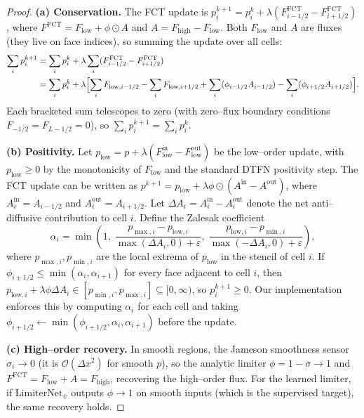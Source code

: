 \documentclass[10pt]{article}
\theoremstyle{definition}
\theoremstyle{remark}
\begin{document}
\begin{proof}
\textbf{(a) Conservation.}
The FCT update is $p^{k+1}_i = p^k_i + \lambda (F^{\mathrm{FCT}}_{i-1/2} -
F^{\mathrm{FCT}}_{i+1/2})$, where $F^{\mathrm{FCT}} = F_{\mathrm{low}} +
\phi \odot A$ and $A = F_{\mathrm{high}} - F_{\mathrm{low}}$.
Both $F_{\mathrm{low}}$ and $A$ are fluxes (they live on face
indices), so summing the update over all cells:
\begin{align*}
  \sum_i p^{k+1}_i
  &= \sum_i p^k_i + \lambda \sum_i (F^{\mathrm{FCT}}_{i-1/2} - F^{\mathrm{FCT}}_{i+1/2}) \\
  &= \sum_i p^k_i + \lambda \Bigl[
       \sum_i F_{\mathrm{low},i-1/2} - \sum_i F_{\mathrm{low},i+1/2}
       + \sum_i (\phi_{i-1/2} A_{i-1/2}) - \sum_i (\phi_{i+1/2} A_{i+1/2})
     \Bigr].
\end{align*}
Each bracketed sum telescopes to zero (with zero--flux boundary
conditions $F_{-1/2} = F_{L-1/2} = 0$), so $\sum_i p^{k+1}_i = \sum_i
p^k_i$.

\textbf{(b) Positivity.}
Let $p_{\mathrm{low}} = p + \lambda (F_{\mathrm{low}}^{\mathrm{in}} -
F_{\mathrm{low}}^{\mathrm{out}})$ be the low--order update, with
$p_{\mathrm{low}} \ge 0$ by the monotonicity of $F_{\mathrm{low}}$ and
the standard DTFN positivity step.  The FCT update can be written as
$p^{k+1} = p_{\mathrm{low}} + \lambda \phi \odot (A^{\mathrm{in}} -
A^{\mathrm{out}})$, where $A^{\mathrm{in}}_i = A_{i-1/2}$ and
$A^{\mathrm{out}}_i = A_{i+1/2}$.  Let $\Delta A_i = A^{\mathrm{in}}_i
- A^{\mathrm{out}}_i$ denote the net anti--diffusive contribution to
cell $i$.  Define the Zalesak coefficient
\[
  \alpha_i = \min\!\left(1,\;
    \frac{p_{\max,i} - p_{\mathrm{low},i}}{\max(\Delta A_i, 0) + \varepsilon},\;
    \frac{p_{\mathrm{low},i} - p_{\min,i}}{\max(-\Delta A_i, 0) + \varepsilon}
  \right),
\]
where $p_{\max,i}, p_{\min,i}$ are the local extrema of $p_{\mathrm{low}}$
in the stencil of cell $i$.  If $\phi_{i\pm 1/2} \le \min(\alpha_i,
\alpha_{i+1})$ for every face adjacent to cell $i$, then
$p_{\mathrm{low},i} + \lambda \phi \Delta A_i \in [p_{\min,i},
p_{\max,i}] \subseteq [0, \infty)$, so $p^{k+1}_i \ge 0$.  Our
implementation enforces this by computing $\alpha_i$ for each cell
and taking $\phi_{i+1/2} \leftarrow \min(\phi_{i+1/2}, \alpha_i,
\alpha_{i+1})$ before the update.

\textbf{(c) High--order recovery.}
In smooth regions, the Jameson smoothness sensor $\sigma_i \to 0$ (it
is $\mathcal{O}(\Delta x^2)$ for smooth $p$), so the analytic limiter
$\phi = 1 - \sigma \to 1$ and $F^{\mathrm{FCT}} = F_{\mathrm{low}} + A
= F_{\mathrm{high}}$, recovering the high--order flux.  For the
learned limiter, if $\mathrm{LimiterNet}_\psi$ outputs $\phi \to 1$ on
smooth inputs (which is the supervised target), the same recovery
holds.
\end{proof}
\end{document}
